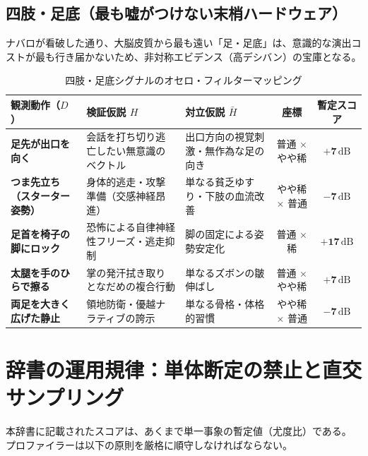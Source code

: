 \subsection{四肢・足底（最も嘘がつけない末梢ハードウェア）}

ナバロが看破した通り、大脳皮質から最も遠い「足・足底」は、意識的な演出コストが最も行き届かないため、非対称エビデンス（高デシバン）の宝庫となる。

\begin{table}[htbp]
\centering
\small
\caption{四肢・足底シグナルのオセロ・フィルターマッピング}
\label{tab:dict_limbs_feet}
\begin{tabularx}{\textwidth}{>{\hsize=0.9\hsize}X >{\hsize=1.1\hsize}X >{\hsize=1.0\hsize}X c c}
\toprule
\textbf{観測動作（$D$）} & \textbf{検証仮説 $H$} & \textbf{対立仮説 $\bar{H}$} & \textbf{座標} & \textbf{暫定スコア} \\
\midrule
\textbf{足先が出口を向く} & 会話を打ち切り逃亡したい無意識のベクトル & 出口方向の視覚刺激・無作為な足の向き & 普通 $\times$ やや稀 & $\mathbf{+7\,\mathrm{dB}}$ \\
\textbf{つま先立ち（スターター姿勢）} & 身体的逃走・攻撃準備（交感神経昂進） & 単なる貧乏ゆすり・下肢の血流改善 & やや稀 $\times$ 普通 & $\mathbf{-7\,\mathrm{dB}}$ \\
\textbf{足首を椅子の脚にロック} & 恐怖による自律神経性フリーズ・逃走抑制 & 脚の固定による姿勢安定化 & 普通 $\times$ 稀 & $\mathbf{+17\,\mathrm{dB}}$ \\
\textbf{太腿を手のひらで擦る} & 掌の発汗拭き取りとなだめの複合行動 & 単なるズボンの皺伸ばし & 普通 $\times$ やや稀 & $\mathbf{+7\,\mathrm{dB}}$ \\
\textbf{両足を大きく広げた静止} & 領地防衛・優越ナラティブの誇示 & 単なる骨格・体格的習慣 & やや稀 $\times$ 普通 & $\mathbf{-7\,\mathrm{dB}}$ \\
\bottomrule
\end{tabularx}
\end{table}


\section{辞書の運用規律：単体断定の禁止と直交サンプリング}

本辞書に記載されたスコアは、あくまで単一事象の暫定値（尤度比）である。
プロファイラーは以下の原則を厳格に順守しなければならない。

